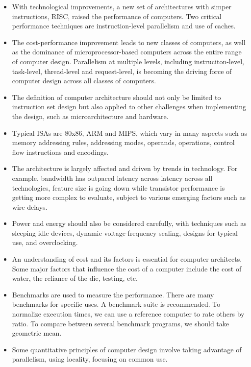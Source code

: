 \documentclass{article}
\begin{document}
\begin{enumerate}
\begin{itemize}
    \item With technological improvements, a new set of architectures with simper instructions, RISC, raised the performance of computers. Two critical performance techniques are instruction-level parallelism and use of caches.
    \item The cost-performance improvement leads to new classes of computers, as well as the dominance of microprocessor-based computers across the entire range of computer design. Parallelism at multiple levels, including instruciton-level, task-level, thread-level and request-level, is becoming the driving force of computer design across all classes of computers.
    \item The definition of computer architecture should not only be limited to instruction set design but also applied to other challenges when implementing the design, such as microarchitecture and hardware.
    \item Typical ISAs are 80x86, ARM and MIPS, which vary in many aspects such as memory addressing rules, addressing modes, operands, operations, control flow instructions and encodings.
    \item The architecture is largely affected and driven by trends in technology. For example, bandwidth has outpaced latency across latency across all technologies, feature size is going down while transistor performance is getting more complex to evaluate, subject to various emerging factors such as wire delays.
    \item Power and energy should also be considered carefully, with techniques such as sleeping idle devices, dynamic voltage-frequency scaling, designs for typical use, and overclocking.
    \item An understanding of cost and its factors is essential for computer architects. Some major factors that influence the cost of a computer include the cost of water, the reliance of the die, testing, etc.
    \item Benchmarks are used to measure the performance. There are many benchmarks for specific uses. A benchmark suite is recommended. To normalize execution times, we can use a reference computer to rate others by ratio. To compare between several benchmark programs, we should take geometric mean.
    \item Some quantitative principles of computer design involve taking advantage of parallelism, using locality, focusing on common use.
\end{itemize}


\end{enumerate}
\end{document}
